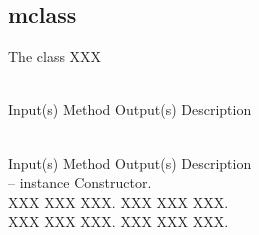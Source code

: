 %
%
%
%
%

\subsection{mclass}
\label{sec:mclass}

The  class XXX

\begin{longtable}{}
\caption{mclass summary}
\\
\hline
\optableent
	{Input(s)}
	{Method}
	{Output(s)}
	{Description}
\hline \hline
\endfirsthead
\caption[]{\emph{continued}} \\
\hline
\optableent
	{Input(s)}
	{Method}
	{Output(s)}
	{Description}
\hline \hline \endhead
{} \endfoot
\hline \endlastfoot
 \\
\hline \hline
\optableent
	{--}
	{{\bf {}}}
	{instance}
	{Constructor.}
\hline \hline
{} \\
\hline \hline
\optableent
	{XXX}
	{{\bf {}}}
	{XXX}
	{XXX.}
\hline
\optableent
	{XXX}
	{{\bf {}}}
	{XXX}
	{XXX.}
\hline \hline
{} \\
\hline \hline
\optableent
	{XXX}
	{{\bf {}}}
	{XXX}
	{XXX.}
\hline
\optableent
	{XXX}
	{{\bf {}}}
	{XXX}
	{XXX.}
\end{longtable}

